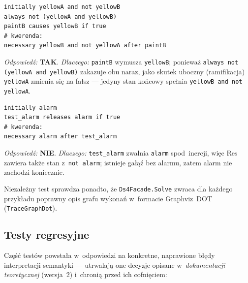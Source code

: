\documentclass[11pt,a4paper]{article}
\newcommand{\Res}{\mathrm{Res}}
\begin{document}
\begin{lstlisting}[style=ds4code, caption={Malowanie --- więz integralności wymusza zmianę (rodzina scenario)}]
initially yellowA and not yellowB
always not (yellowA and yellowB)
paintB causes yellowB if true
# kwerenda:
necessary yellowB and not yellowA after paintB
\end{lstlisting}
\emph{Odpowiedź:} \textbf{TAK}. \emph{Dlaczego:} \texttt{paintB} wymusza
\texttt{yellowB}; ponieważ \texttt{always not (yellowA and yellowB)} zakazuje
obu naraz, jako skutek uboczny (ramifikacja) \texttt{yellowA} zmienia się na
fałsz --- jedyny stan końcowy spełnia \texttt{yellowB and not yellowA}.

\begin{lstlisting}[style=ds4code, caption={Test alarmu --- releases znosi konieczność (rodzina scenario)}]
initially alarm
test_alarm releases alarm if true
# kwerenda:
necessary alarm after test_alarm
\end{lstlisting}
\emph{Odpowiedź:} \textbf{NIE}. \emph{Dlaczego:} \texttt{test\_alarm} zwalnia
\texttt{alarm} spod~inercji, więc $\Res$ zawiera także stan z~\texttt{not alarm};
istnieje gałąź bez alarmu, zatem alarm nie zachodzi koniecznie.

Niezależny test sprawdza ponadto, że \texttt{Ds4Facade.Solve} zwraca dla każdego
przykładu poprawny opis grafu wykonań w~formacie Graphviz~DOT
(\texttt{TraceGraphDot}).

\subsection{Testy regresyjne}

Część testów powstała w~odpowiedzi na konkretne, naprawione błędy interpretacji
semantyki --- utrwalają one decyzje opisane w~\emph{dokumentacji teoretycznej}
(wersja~2) i~chronią przed ich cofnięciem:
\end{document}
